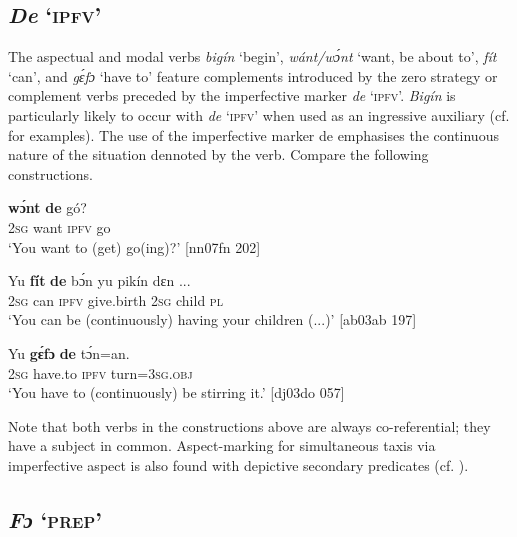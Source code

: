 \subsection{\textit{De} ‘\textsc{ipfv}’}\label{sec:10.5.3}

The aspectual and modal verbs \textit{bigín} ‘begin’, \textit{wánt/wɔ́nt} ‘want, be about to’, \textit{fít} ‘can’, and \textit{gɛ́fɔ} ‘have to’ feature complements introduced by the zero strategy or complement verbs preceded by the imperfective marker \textit{de} ‘\textsc{ipfv}’. \textit{Bigín} is particularly likely to occur with \textit{de} ‘\textsc{ipfv}’ when used as an ingressive auxiliary (cf.  for examples). The use of the imperfective marker de emphasises the continuous nature of the situation dennoted by the verb. Compare the following constructions.{\fff}


\ea%
    \label{ex:key:1381}
\gll
           \textbf{wɔ́nt}  \textbf{de} gó?\\
\textsc{2sg}  want  \textsc{ipfv}  go\\

\glt ‘You want to (get) go(ing)?’ [nn07fn 202]
\z


\ea%
    \label{ex:key:1382}
\gll
Yu  \textbf{fít}  \textbf{de} bɔ́n\textbf{}     yu  pikín  dɛn   \op...\cp{}\\
\textsc{2sg}  can  \textsc{ipfv}  give.birth  \textsc{2sg}  child  \textsc{pl}\\

\glt ‘You can be (continuously) having your children (...)’ [ab03ab 197]
\z


\ea%
    \label{ex:key:1383}
    \gll Yu  \textbf{gɛ́fɔ}    \textbf{de}  tɔ́n=an.\\
\textsc{2sg}  have.to  \textsc{ipfv}  turn=\textsc{3sg.obj}\\

\glt ‘You have to (continuously) be stirring it.’ [dj03do 057]
\z

Note that both verbs in the constructions above are always co-referential; they have a subject in common. Aspect-marking for simultaneous taxis via imperfective aspect is also found with depictive secondary predicates (cf. ).

\subsection{\textit{Fɔ} ‘\textsc{prep}’} 

